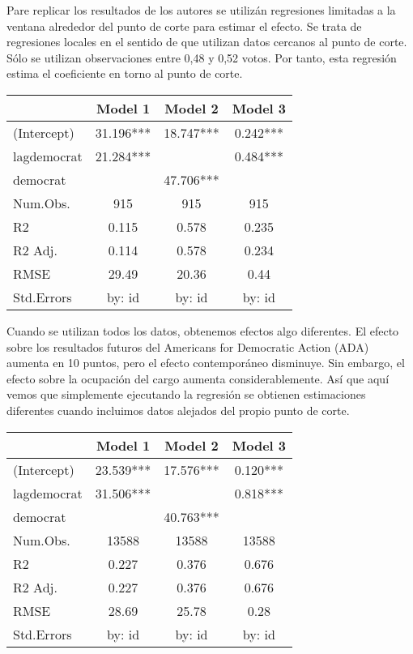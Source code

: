 \documentclass[
]{article}
\begin{document}
Pare replicar los resultados de los autores se utilizán regresiones
limitadas a la ventana alrededor del punto de corte para estimar el
efecto. Se trata de regresiones locales en el sentido de que utilizan
datos cercanos al punto de corte. Sólo se utilizan observaciones entre
0,48 y 0,52 votos. Por tanto, esta regresión estima el coeficiente en
torno al punto de corte.

\begin{table}
\centering
\begin{tabular}[t]{lccc}
\toprule
  & Model 1 & Model 2 & Model 3\\
\midrule
(Intercept) & \num{31.196}*** & \num{18.747}*** & \num{0.242}***\\
lagdemocrat & \num{21.284}*** &  & \num{0.484}***\\
democrat &  & \num{47.706}*** & \\
\midrule
Num.Obs. & \num{915} & \num{915} & \num{915}\\
R2 & \num{0.115} & \num{0.578} & \num{0.235}\\
R2 Adj. & \num{0.114} & \num{0.578} & \num{0.234}\\
RMSE & \num{29.49} & \num{20.36} & \num{0.44}\\
Std.Errors & by: id & by: id & by: id\\
\bottomrule
\end{tabular}
\end{table}

Cuando se utilizan todos los datos, obtenemos efectos algo diferentes.
El efecto sobre los resultados futuros del Americans for Democratic
Action (ADA) aumenta en 10 puntos, pero el efecto contemporáneo
disminuye. Sin embargo, el efecto sobre la ocupación del cargo aumenta
considerablemente. Así que aquí vemos que simplemente ejecutando la
regresión se obtienen estimaciones diferentes cuando incluimos datos
alejados del propio punto de corte.

\begin{table}
\centering
\begin{tabular}[t]{lccc}
\toprule
  & Model 1 & Model 2 & Model 3\\
\midrule
(Intercept) & \num{23.539}*** & \num{17.576}*** & \num{0.120}***\\
lagdemocrat & \num{31.506}*** &  & \num{0.818}***\\
democrat &  & \num{40.763}*** & \\
\midrule
Num.Obs. & \num{13588} & \num{13588} & \num{13588}\\
R2 & \num{0.227} & \num{0.376} & \num{0.676}\\
R2 Adj. & \num{0.227} & \num{0.376} & \num{0.676}\\
RMSE & \num{28.69} & \num{25.78} & \num{0.28}\\
Std.Errors & by: id & by: id & by: id\\
\bottomrule
\end{tabular}
\end{table}
\end{document}
